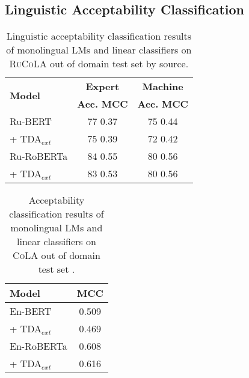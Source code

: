 \documentclass[11pt]{article}
\begin{document}
\subsection{ Linguistic Acceptability  Classification}\label{sec:app_res}
\begin{table}[th!]
\small
\centering
\newcommand{\hsp}{\hspace{4pt}}
\begin{tabular}{@{}lcc@{}} 
\toprule
\multirow{2}{*}{\textbf{Model}} &  \textbf{Expert} & \textbf{Machine} \\ [0.4ex]
&  \textbf{Acc.} \hsp \textbf{MCC} & \textbf{Acc.} \hsp \textbf{MCC}\\

\midrule
Ru-BERT & 77 \hsp 0.37 & 75 \hsp 0.44 \\ 
+ TDA$_{ext}$  & 75 \hsp 0.39 & 72 \hsp 0.42 \\
\midrule
Ru-RoBERTa  & 84 \hsp 0.55 & 80 \hsp 0.56  \\ 
+ TDA$_{ext}$  & 83 \hsp 0.53 & 80 \hsp 0.56  \\ 
\bottomrule
\end{tabular}
\caption{Linguistic acceptability  classification results of monolingual LMs and linear classifiers on \textsc{RuCoLA} out of domain test set by source.}
\label{tab:rucola_test}
\end{table}
\begin{table}[th!]
\small
\centering
\begin{tabular}{@{}lc@{}} 
\toprule
\textbf{Model} &  \textbf{MCC}\\
\midrule
En-BERT & 0.509\\
+ TDA$_{ext}$  & 0.469\\
\midrule
En-RoBERTa  & 0.608\\
+ TDA$_{ext}$  & 0.616\\
\bottomrule
\end{tabular}
\caption{Acceptability classification results of monolingual LMs and linear classifiers on \textsc{CoLA} out of domain test set \cite{cola-out-of-domain-open-evaluation}.}
\label{tab:cola_test}

\end{table}
\end{document}
